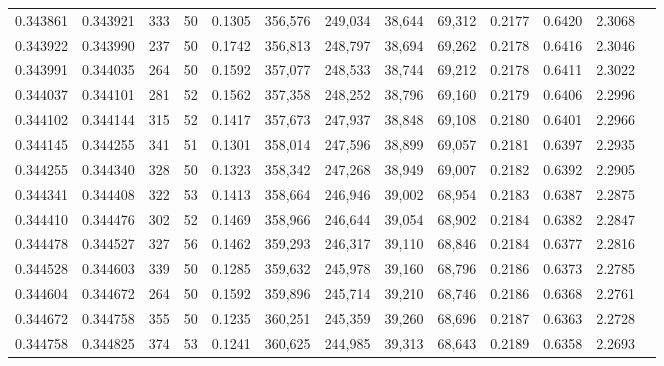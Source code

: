 \begin{tabular}{rrrrrrrrrrrrr}
0.343861 & 0.343921 &   333 &  50 &                                     0.1305 & 356,576 & 249,034 &  38,644 &  69,312 & 0.2177 & 0.6420 & 2.3068 \\
0.343922 & 0.343990 &   237 &  50 &                                     0.1742 & 356,813 & 248,797 &  38,694 &  69,262 & 0.2178 & 0.6416 & 2.3046 \\
0.343991 & 0.344035 &   264 &  50 &                                     0.1592 & 357,077 & 248,533 &  38,744 &  69,212 & 0.2178 & 0.6411 & 2.3022 \\
0.344037 & 0.344101 &   281 &  52 &                                     0.1562 & 357,358 & 248,252 &  38,796 &  69,160 & 0.2179 & 0.6406 & 2.2996 \\
0.344102 & 0.344144 &   315 &  52 &                                     0.1417 & 357,673 & 247,937 &  38,848 &  69,108 & 0.2180 & 0.6401 & 2.2966 \\
0.344145 & 0.344255 &   341 &  51 &                                     0.1301 & 358,014 & 247,596 &  38,899 &  69,057 & 0.2181 & 0.6397 & 2.2935 \\
0.344255 & 0.344340 &   328 &  50 &                                     0.1323 & 358,342 & 247,268 &  38,949 &  69,007 & 0.2182 & 0.6392 & 2.2905 \\
0.344341 & 0.344408 &   322 &  53 &                                     0.1413 & 358,664 & 246,946 &  39,002 &  68,954 & 0.2183 & 0.6387 & 2.2875 \\
0.344410 & 0.344476 &   302 &  52 &                                     0.1469 & 358,966 & 246,644 &  39,054 &  68,902 & 0.2184 & 0.6382 & 2.2847 \\
0.344478 & 0.344527 &   327 &  56 &                                     0.1462 & 359,293 & 246,317 &  39,110 &  68,846 & 0.2184 & 0.6377 & 2.2816 \\
0.344528 & 0.344603 &   339 &  50 &                                     0.1285 & 359,632 & 245,978 &  39,160 &  68,796 & 0.2186 & 0.6373 & 2.2785 \\
0.344604 & 0.344672 &   264 &  50 &                                     0.1592 & 359,896 & 245,714 &  39,210 &  68,746 & 0.2186 & 0.6368 & 2.2761 \\
0.344672 & 0.344758 &   355 &  50 &                                     0.1235 & 360,251 & 245,359 &  39,260 &  68,696 & 0.2187 & 0.6363 & 2.2728 \\
0.344758 & 0.344825 &   374 &  53 &                                     0.1241 & 360,625 & 244,985 &  39,313 &  68,643 & 0.2189 & 0.6358 & 2.2693 \\

\end{tabular}
